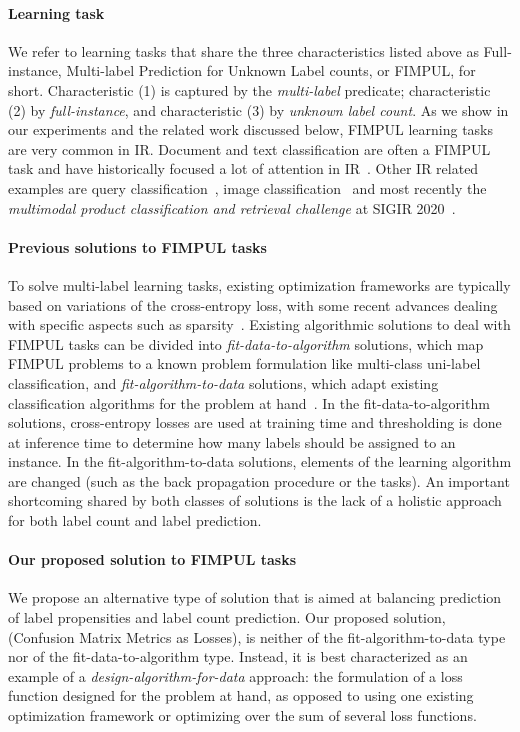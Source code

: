 \paragraph{Learning task}
We refer to learning tasks that share the three characteristics listed above as Full-instance, Multi-label Prediction for Unknown Label counts, or FIMPUL, for short.
Characteristic (1) is captured by the \emph{multi-label} predicate; characteristic (2) by \emph{full-instance}, and characteristic (3) by \emph{unknown label count}.
As we show in our experiments and the related work discussed below, FIMPUL learning tasks are very common in \ac{IR}. Document and text classification are often a FIMPUL task and have historically focused a lot of attention in \ac{IR}~\cite{IRClassStat, textCategorization, statTextCategorization, documentClassification}. Other \ac{IR} related examples are query classification~\cite{queryClassification}, image classification~\cite{imageClassification} and most recently the \textit{multimodal product classification and retrieval challenge} at SIGIR 2020~\cite{Amoualian2020SIGIR2E}. 

\paragraph{Previous solutions to FIMPUL tasks}
To solve multi-label learning tasks, existing optimization frameworks are typically based on variations of the cross-entropy loss, with some recent advances dealing with specific aspects such as sparsity~\citep[see, e.g.,][]{focalLoss,tencent}.
Existing algorithmic solutions to deal with FIMPUL tasks can be divided into \emph{fit-data-to-algorithm} solutions, which map FIMPUL problems to a known problem formulation like multi-class uni-label classification, and \emph{fit-algorithm-to-data} solutions, which adapt existing classification algorithms for the problem at hand~\citep{multilabelMethods}. In the fit-data-to-algorithm solutions, cross-entropy losses are used at training time and thresholding is done at inference time to determine how many labels should be assigned to an instance. In the fit-algorithm-to-data solutions, elements of the learning algorithm are changed (such as the back propagation procedure or the tasks). An important shortcoming shared by both classes of solutions is the lack of a holistic approach for both label count and label prediction.

\paragraph{Our proposed solution to FIMPUL tasks}
We propose an alternative type of solution that is aimed at balancing prediction of label propensities and label count prediction. Our proposed solution, \solution (Confusion Matrix Metrics as Losses), is neither of the fit-algorithm-to-data type nor of the fit-data-to-algorithm type.
Instead, it is best characterized as an example of a \emph{design-algorithm-for-data} approach: the formulation of a loss function designed for the problem at hand, as opposed to using one existing optimization framework or optimizing over the sum of several loss functions.

